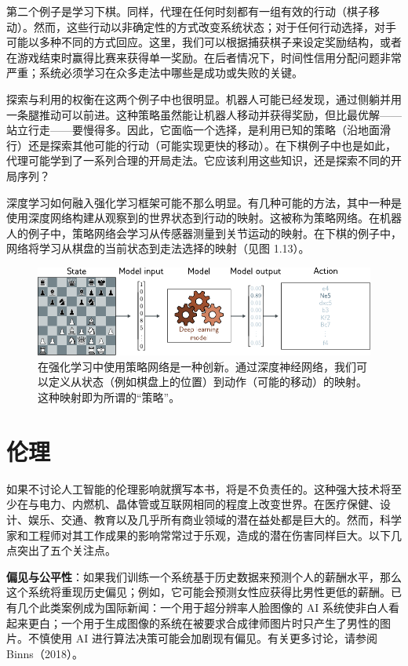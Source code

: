 \documentclass[lang=cn,newtx,10pt,scheme=chinese]{elegantbook}
\begin{document}
第二个例子是学习下棋。同样，代理在任何时刻都有一组有效的行动（棋子移动）。然而，这些行动以非确定性的方式改变系统状态；对于任何行动选择，对手可能以多种不同的方式回应。这里，我们可以根据捕获棋子来设定奖励结构，或者在游戏结束时赢得比赛来获得单一奖励。在后者情况下，时间性信用分配问题非常严重；系统必须学习在众多走法中哪些是成功或失败的关键。

探索与利用的权衡在这两个例子中也很明显。机器人可能已经发现，通过侧躺并用一条腿推动可以前进。这种策略虽然能让机器人移动并获得奖励，但比最优解——站立行走——要慢得多。因此，它面临一个选择，是利用已知的策略（沿地面滑行）还是探索其他可能的行动（可能实现更快的移动）。在下棋例子中也是如此，代理可能学到了一系列合理的开局走法。它应该利用这些知识，还是探索不同的开局序列？

深度学习如何融入强化学习框架可能不那么明显。有几种可能的方法，其中一种是使用深度网络构建从观察到的世界状态到行动的映射。这被称为策略网络。在机器人的例子中，策略网络会学习从传感器测量到关节运动的映射。在下棋的例子中，网络将学习从棋盘的当前状态到走法选择的映射（见图 1.13）。

\begin{figure}
	\centering
	\includegraphics[width=0.7\linewidth]{PDFFigures/UDLChap1PDF/IntroReinforce.pdf}
	\caption{在强化学习中使用策略网络是一种创新。通过深度神经网络，我们可以定义从状态（例如棋盘上的位置）到动作（可能的移动）的映射。这种映射即为所谓的“策略”。}
\end{figure}


\section{伦理}
如果不讨论人工智能的伦理影响就撰写本书，将是不负责任的。这种强大技术将至少在与电力、内燃机、晶体管或互联网相同的程度上改变世界。在医疗保健、设计、娱乐、交通、教育以及几乎所有商业领域的潜在益处都是巨大的。然而，科学家和工程师对其工作成果的影响常常过于乐观，造成的潜在伤害同样巨大。以下几点突出了五个关注点。

\textbf{偏见与公平性}：如果我们训练一个系统基于历史数据来预测个人的薪酬水平，那么这个系统将重现历史偏见；例如，它可能会预测女性应获得比男性更低的薪酬。已有几个此类案例成为国际新闻：一个用于超分辨率人脸图像的 AI 系统使非白人看起来更白；一个用于生成图像的系统在被要求合成律师图片时只产生了男性的图片。不慎使用 AI 进行算法决策可能会加剧现有偏见。有关更多讨论，请参阅 Binns（2018）。
\end{document}
